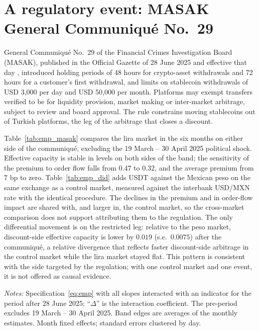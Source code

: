 \documentclass[12pt]{article}
\theoremstyle{definition}
\theoremstyle{remark}
\begin{document}
\section{A regulatory event: MASAK General Communiqu\'e No.~29}\label{app:masak}

General Communiqu\'e No.~29 of the Financial Crimes Investigation Board (MASAK), published in the Official Gazette of 28 June 2025 and effective that day \citep{masak2025}, introduced holding periods of 48 hours for crypto-asset withdrawals and 72 hours for a customer's first withdrawal, and limits on stablecoin withdrawals of USD 3,000 per day and USD 50,000 per month. Platforms may exempt transfers verified to be for liquidity provision, market making or inter-market arbitrage, subject to review and board approval. The rule constrains moving stablecoins out of Turkish platforms, the leg of the arbitrage that closes a discount.

Table~\ref{tab:emp_masak} compares the lira market in the six months on either side of the communiqu\'e, excluding the 19 March -- 30 April 2025 political shock. Effective capacity is stable in levels on both sides of the band; the sensitivity of the premium to order flow falls from $0.47$ to $0.32$, and the average premium from 7 bp to zero. Table~\ref{tab:emp_did} adds USDT against the Mexican peso on the same exchange as a control market, measured against the interbank USD/MXN rate with the identical procedure. The declines in the premium and in order-flow impact are shared with, and larger in, the control market, so the cross-market comparison does not support attributing them to the regulation. The only differential movement is on the restricted leg: relative to the peso market, discount-side effective capacity is lower by $0.019$ (s.e.\ $0.0075$) after the communiqu\'e, a relative divergence that reflects faster discount-side arbitrage in the control market while the lira market stayed flat. This pattern is consistent with the side targeted by the regulation; with one control market and one event, it is not offered as causal evidence.

\begin{table}[t]
\centering
\caption{\textbf{The lira market around MASAK General Communiqu\'e No.~29 (28 June 2025)}}
\label{tab:emp_masak}
\footnotesize
\resizebox{\ifdim\width>\textwidth\textwidth\else\width\fi}{!}{}
\begin{minipage}{0.95\textwidth}
\footnotesize\vspace{4pt}
\emph{Notes:} Specification~\eqref{eq:emp} with all slopes interacted with an indicator for the period after 28 June 2025; ``$\Delta$'' is the interaction coefficient. The pre-period excludes 19 March -- 30 April 2025. Band edges are averages of the monthly estimates. Month fixed effects; standard errors clustered by day.
\end{minipage}
\end{table}
\end{document}
